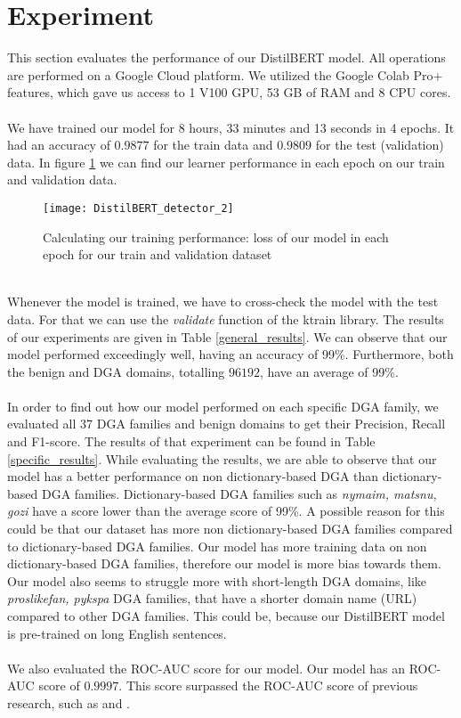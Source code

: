\section{Experiment}

This section evaluates the performance of our DistilBERT model. All operations are performed on a Google Cloud platform. We utilized the Google Colab Pro+ features, which gave us access to 1 V100 GPU, 53 GB of RAM and 8 CPU cores.\\\\ 
We have trained our model for 8 hours, 33 minutes and 13 seconds in 4 epochs. It had an accuracy of $0.9877$ for the train data and $0.9809$ for the test (validation) data. In figure \ref{figure_model} we can find our learner performance in each epoch on our train and validation data.
\begin{figure}[!htb]
    \texttt{[image: DistilBERT\_detector\_2]}
    \caption{Calculating our training performance: loss of our model in each epoch for our train and validation dataset}
    \label{figure_model}
\end{figure}
\pagebreak
\\Whenever the model is trained, we have to cross-check the model with the test data. For that we can use the \textit{validate} function of the ktrain library. The results of our experiments are given in Table \ref{general_results}. We can observe that our model performed exceedingly well, having an accuracy of 99\%. Furthermore, both the benign and DGA domains, totalling $96192$, have an average of 99\%.\\\\
In order to find out how our model performed on each specific DGA family, we evaluated all 37 DGA families and benign domains to get their Precision, Recall and F1-score. The results of that experiment can be found in Table \ref{specific_results}. While evaluating the results, we are able to observe that our model has a better performance on non dictionary-based DGA than dictionary-based DGA families. Dictionary-based DGA families such as \textit{nymaim, matsnu, gozi} have a score lower than the average score of 99\%. A possible reason for this could be that our dataset has more non dictionary-based DGA families compared to dictionary-based DGA families. Our model has more training data on non dictionary-based DGA families, therefore our model is more bias towards them. Our model also seems to struggle more with short-length DGA domains, like \textit{proslikefan, pykspa} DGA families, that have a shorter domain name (URL) compared to other DGA families. This could be, because our DistilBERT model is pre-trained on long English sentences.\\\\  
We also evaluated the ROC-AUC score for our model. Our model has an ROC-AUC score of $0.9997$. This score surpassed the ROC-AUC score of previous research, such as \cite{Highnam} and \cite{Woodbridge}.


